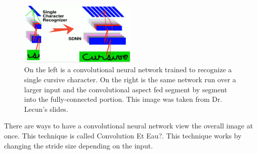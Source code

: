\begin{figure}[ht]
  \centering
      \includegraphics[width=0.5\textwidth]{lectures/03-b/images/SDNN.png}
          \caption{
            On the left is a convolutional neural network trained to recognize a single cursive character.
            On the right is the same network run over a larger input and the convolutional aspect fed segment by segment into the fully-connected portion.
            This image was taken from Dr. Lecun's slides.
          }
\end{figure}

There are ways to have a convolutional neural network view the overall image at once.
This technique is called 
Convolution Et Eau?.
This technique works by changing the stride size depending on the input.